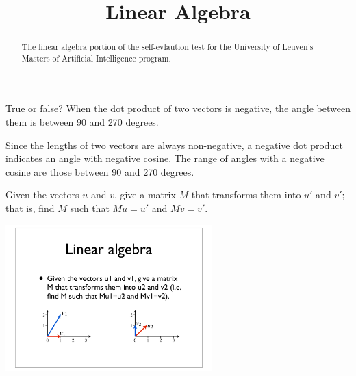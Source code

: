 \documentclass{ximera}
\title{Linear Algebra}
\begin{document}
\begin{abstract}
The linear algebra portion of the self-evlaution test for the
University of Leuven's Masters of Artificial Intelligence program.
\end{abstract}
\maketitle

\begin{question}
True or false?  When the dot product of two vectors is negative, the angle between them is between 90 and 270 degrees.
\begin{solution}
\begin{multiple-choice}
\end{multiple-choice}
\end{solution}
Since the lengths of two vectors are always non-negative, a negative dot product indicates an angle with negative cosine. The range of angles with a negative cosine are those between 90 and 270 degrees.
\end{question}

\begin{question}
Given the vectors $u$ and $v$, give a matrix $M$ that transforms them
into $u'$ and $v'$; that is, find $M$ such that $M u=u'$ and $M v=v'$.
\begin{image}
\includegraphics[width=0.6\textwidth]{fig.pdf}
\end{image}
\end{question}
\end{document}
